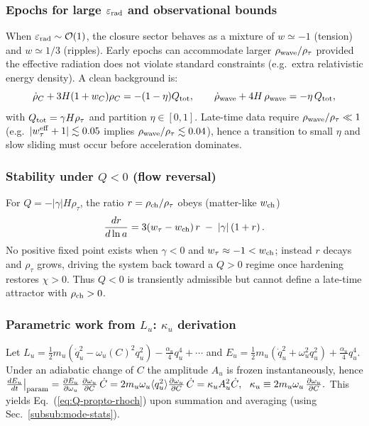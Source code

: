 \documentclass[11pt]{article}
\begin{document}
\subsubsection{Epochs for large $\varepsilon_{\rm rad}$ and observational bounds}\label{subsub:epsrad-epochs}
When $\varepsilon_{\rm rad}\sim \mathcal O(1)$, the closure sector behaves as a mixture of $w\simeq -1$ (tension) and $w\simeq 1/3$ (ripples).
Early epochs can accommodate larger $\rho_{\rm wave}/\rho_\tau$ provided the effective radiation does not violate standard constraints (e.g.\ extra relativistic energy density). A clean background is:
\begin{equation}
\dot\rho_C + 3H(1+w_C)\rho_C = - (1-\eta)Q_{\rm tot},\qquad
\dot\rho_{\rm wave} + 4H\,\rho_{\rm wave} = - \eta\,Q_{\rm tot},
\end{equation}
with $Q_{\rm tot}=\gamma H \rho_\tau$ and partition $\eta\in[0,1]$.
Late-time data require $\rho_{\rm wave}/\rho_\tau \ll 1$ (e.g.\ $|w_\tau^{\rm eff}+1|\lesssim 0.05$ implies $\rho_{\rm wave}/\rho_\tau\lesssim 0.04$), hence a transition to small $\eta$ and slow sliding must occur before acceleration dominates.

\subsubsection{Stability under $Q<0$ (flow reversal)}\label{subsub:qneg}
For $Q=-|\gamma|H\rho_\tau$, the ratio $r=\rho_{\rm ch}/\rho_\tau$ obeys (matter-like $w_{\rm ch}$)
\begin{equation}
\frac{dr}{d\ln a} = 3(w_\tau-w_{\rm ch})\,r \;-\; |\gamma|\,(1+r)\,.
\end{equation}
No positive fixed point exists when $\gamma<0$ and $w_\tau\approx -1<w_{\rm ch}$; instead $r$ decays and $\rho_\tau$ grows, driving the system back toward a $Q>0$ regime once hardening restores $\chi>0$. Thus $Q<0$ is transiently admissible but cannot define a late-time attractor with $\rho_{\rm ch}>0$.


\subsubsection{Parametric work from $L_u$: $\kappa_u$ derivation}\label{subsub:kappa-deriv}
Let $L_u=\tfrac12 m_u(\dot q_u^2-\omega_u(C)^2 q_u^2) - \tfrac{\alpha_u}{4} q_u^4+\cdots$ and $E_u=\tfrac12 m_u(\dot q_u^2+\omega_u^2 q_u^2)+\tfrac{\alpha_u}{4}q_u^4$.
Under an adiabatic change of $C$ the amplitude $A_u$ is frozen instantaneously, hence
\(
\frac{dE_u}{dt}\big|_{\rm param} = \frac{\partial E_u}{\partial \omega_u}\,\frac{\partial\omega_u}{\partial C}\,\dot C
= 2 m_u \omega_u \langle q_u^2\rangle \frac{\partial\omega_u}{\partial C}\,\dot C
= \kappa_u A_u^2 \dot C, \ \ \kappa_u \equiv 2m_u\omega_u\,\frac{\partial\omega_u}{\partial C}.
\)
This yields Eq.~(\ref{eq:Q-propto-rhoch}) upon summation and averaging (using Sec.~\ref{subsub:mode-stats}).
\end{document}
